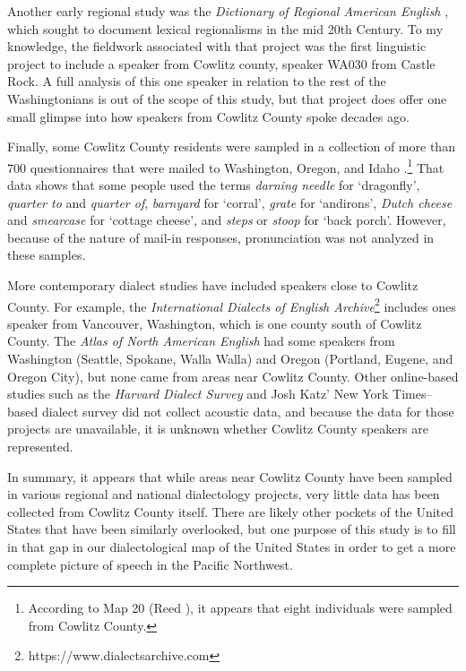 Another early regional study was the \textit{Dictionary of Regional American English} \citep{cassidy_2013_dare}, which sought to document lexical regionalisms in the mid 20th Century. To my knowledge, the fieldwork associated with that project was the first linguistic project to include a speaker from Cowlitz county, speaker WA030 from Castle Rock. A full analysis of this one speaker in relation to the rest of the Washingtonians is out of the scope of this study, but that project does offer one small glimpse into how speakers from Cowlitz County spoke decades ago.

Finally, some Cowlitz County residents were sampled in a collection of more than 700 questionnaires that were mailed to Washington, Oregon, and Idaho \citep[61,103--116]{reed_1967}.\footnote{According to Map 20 (Reed \citeyear[104]{reed_1967}), it appears that eight individuals were sampled from Cowlitz County.} That data shows that some people used the terms \textit{darning needle} for `dragonfly', \textit{quarter to} and \textit{quarter of}, \textit{barnyard} for `corral', \textit{grate} for `andirons', \textit{Dutch cheese} and \textit{smearcase} for `cottage cheese', and \textit{steps} or \textit{stoop} for `back porch'. However, because of the nature of mail-in responses, pronunciation was not analyzed in these samples.

More contemporary dialect studies have included speakers close to Cowlitz County. For example, the \textit{International Dialects of English Archive}\footnote{\scriptsize https://www.dialectsarchive.com} includes ones speaker from Vancouver, Washington, which is one county south of Cowlitz County. The \textit{Atlas of North American English} \citep{labov_ash_boberg_2006_anae} had some speakers from Washington (Seattle, Spokane, Walla Walla) and Oregon (Portland, Eugene, and Oregon City), but none came from areas near Cowlitz County. Other online-based studies such as the \textit{Harvard Dialect Survey} \citep{vaux_golder_2003} and Josh Katz' New York Times--based dialect survey \citep{katz_2016} did not collect acoustic data, and because the data for those projects are unavailable, it is unknown whether Cowlitz County speakers are represented.

In summary, it appears that while areas near Cowlitz County have been sampled in various regional and national dialectology projects, very little data has been collected from Cowlitz County itself. There are likely other pockets of the United States that have been similarly overlooked, but one purpose of this study is to fill in that gap in our dialectological map of the United States in order to get a more complete picture of speech in the Pacific Northwest.


